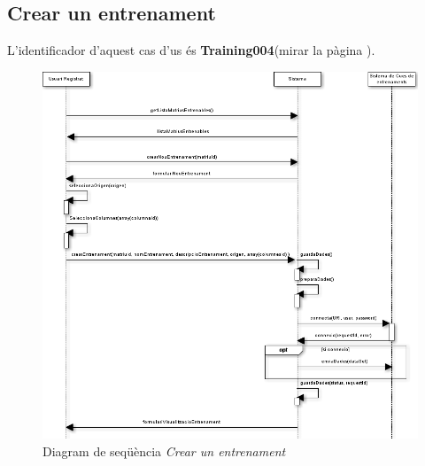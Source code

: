 \subsection*{Crear un entrenament}
L'identificador d'aquest cas d'us \'{e}s \textbf{Training004}(mirar la p\`{a}gina \pageref{training004}).
\begin{figure}[H]
  \centering
  \includegraphics[scale=0.5]{img/specification/SequenceCreateTraining.png}
  \caption{Diagram de seqüència \textit{Crear un entrenament}}
  \label{fig:sequenceaddtraining}
\end{figure}

